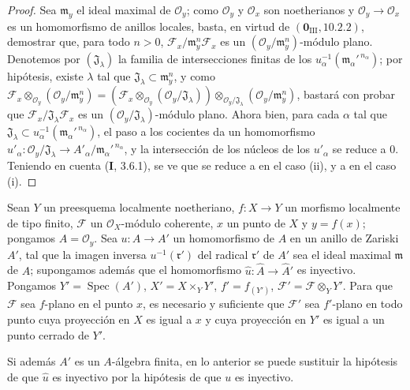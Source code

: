 \begin{proof}
Sea $\mathfrak m_y$ el ideal maximal de $\mathcal O_y$; como $\mathcal O_y$ y $\mathcal O_x$ son noetherianos y $\mathcal O_y\to\mathcal O_x$ es un
homomorfismo de anillos locales, basta, en virtud de $(\mathbf 0_{\mathrm{III}},10.2.2)$, demostrar que, para
todo $n>0$, $\mathcal F_x/\mathfrak m_y^n\mathcal F_x$ es un $(\mathcal O_y/\mathfrak m_y^n)$-módulo plano. Denotemos por $(\mathfrak J_\lambda)$ la familia de
intersecciones finitas de los $u_\alpha^{-1}(\mathfrak m_\alpha'^{\,n_\alpha})$; por hipótesis, existe $\lambda$ tal que
$\mathfrak J_\lambda\subset\mathfrak m_y^n$, y como
$\mathcal F_x\otimes_{\mathcal O_y}(\mathcal O_y/\mathfrak m_y^n)=(\mathcal F_x\otimes_{\mathcal O_y}(\mathcal O_y/\mathfrak J_\lambda))\otimes_{\mathcal O_y/\mathfrak J_\lambda}(\mathcal O_y/\mathfrak m_y^n)$, bastará con probar que $\mathcal F_x/\mathfrak J_\lambda\mathcal F_x$ es
un $(\mathcal O_y/\mathfrak J_\lambda)$-módulo plano. Ahora bien, para cada $\alpha$ tal que
$\mathfrak J_\lambda\subset u_\alpha^{-1}(\mathfrak m_\alpha'^{\,n_\alpha})$, el paso a los cocientes da
un homomorfismo $u'_\alpha:\mathcal O_y/\mathfrak J_\lambda\to
A'_\alpha/\mathfrak m_\alpha'^{\,n_\alpha}$, y la intersección de los núcleos
de los $u'_\alpha$ se reduce a $0$. Teniendo en cuenta (\textbf I, 3.6.1), se ve que se reduce a 
en el caso (ii), y a  en el caso (i).
\end{proof}

\begin{corollary}[11.5.2]
\label{IV.11.5.2}
Sean $Y$ un preesquema localmente noetheriano, $f:X\to Y$ un
morfismo localmente de tipo finito, $\mathcal F$ un $\mathcal O_X$-módulo coherente, $x$ un punto de $X$ y $y=f(x)$; pongamos
$A=\mathcal O_y$. Sea $u:A\to A'$ un homomorfismo de $A$ en un anillo de Zariski $A'$, tal que
la imagen inversa $u^{-1}(\mathfrak r')$ del radical $\mathfrak r'$ de $A'$ sea el ideal maximal $\mathfrak m$ de $A$; supongamos además
que el homomorfismo $\widehat u:\widehat A\to\widehat{A}'$ es inyectivo. Pongamos $Y'=\operatorname{Spec}(A')$, $X'=X\times_Y Y'$, $f'=f_{(Y')}$,
$\mathcal F'=\mathcal F\otimes_Y Y'$. Para que $\mathcal F$ sea $f$-plano en el punto $x$, es necesario y suficiente que $\mathcal F'$ sea $f'$-plano en todo
punto cuya proyección en $X$ es igual a $x$ y cuya proyección en $Y'$ es igual a un punto cerrado
de $Y'$.

Si además $A'$ es un $A$-álgebra finita, en lo anterior se puede sustituir la hipótesis de que $\widehat u$
es inyectivo por la hipótesis de que $u$ es inyectivo.
\end{corollary}

